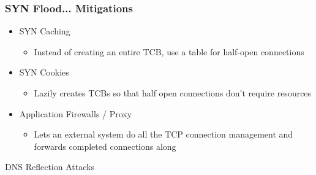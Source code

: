 \documentclass{beamer}
\begin{document}
\begin{frame}
	\frametitle{SYN Flood... Mitigations}
	\begin{itemize}
		\item SYN Caching
			\begin{itemize}
				\item Instead of creating an entire TCB, use a table for half-open
					connections
			\end{itemize}
		\item SYN Cookies
			\begin{itemize}
				\item Lazily creates TCBs so that half open connections don't require
					resources %
			\end{itemize}
		\item Application Firewalls / Proxy
			\begin{itemize}
				\item Lets an external system do all the TCP connection management and
					forwards completed connections along
			\end{itemize}
	\end{itemize}
\end{frame}

\begin{frame}{DNS Reflection Attacks}

\end{frame}
\end{document}
